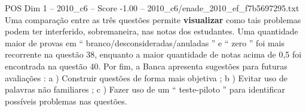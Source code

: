 \begin{textsample}{POS Dim 1 – 2010\_c6 – Score -1.00 – 2010\_c6/enade\_2010\_ef\_f7b5697295.txt}
Uma comparação entre as três questões permite \textbf{visualizar} como tais problemas podem ter interferido, sobremaneira, nas notas dos estudantes.
Uma quantidade maior de provas em “ branco/desconsideradas/anuladas ” e “ zero ” foi mais recorrente na questão 38, enquanto a maior quantidade de notas acima de 0,5 foi encontrada na questão 40.
Por fim, a Banca apresenta sugestões para futuras avaliações : a ) Construir questões de forma mais objetiva ; b ) Evitar uso de palavras não familiares ; c ) Fazer uso de um “ teste-piloto ” para identificar possíveis problemas nas questões.

\end{textsample}

